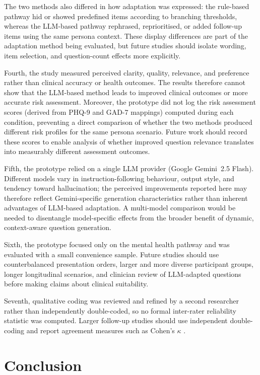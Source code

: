 \documentclass[conference]{IEEEtran}
\begin{document}
The two methods also differed in how adaptation was expressed: the rule-based
pathway hid or showed predefined items according to branching thresholds,
whereas the LLM-based pathway rephrased, reprioritised, or added follow-up
items using the same persona context. These display differences are part of
the adaptation method being evaluated, but future studies should isolate
wording, item selection, and question-count effects more explicitly.

Fourth, the study measured perceived clarity, quality, relevance, and
preference rather than clinical accuracy or health outcomes. The results
therefore cannot show that the LLM-based method leads to improved clinical
outcomes or more accurate risk assessment. Moreover, the prototype did not log
the risk assessment scores (derived from PHQ-9 and GAD-7 mappings) computed
during each condition, preventing a direct comparison of whether the two
methods produced different risk profiles for the same persona scenario. Future
work should record these scores to enable analysis of whether improved question
relevance translates into measurably different assessment outcomes.

Fifth, the prototype relied on a single LLM provider (Google Gemini~2.5
Flash). Different models vary in instruction-following behaviour, output
style, and tendency toward hallucination; the perceived improvements
reported here may therefore reflect Gemini-specific generation
characteristics rather than inherent advantages of LLM-based adaptation.
A multi-model comparison would be needed to disentangle model-specific
effects from the broader benefit of dynamic, context-aware question
generation.

Sixth, the prototype focused only on the mental health pathway and was
evaluated with a small convenience sample. Future studies should use
counterbalanced presentation orders, larger and more diverse participant
groups, longer longitudinal scenarios, and clinician review of
LLM-adapted questions before making claims about clinical suitability.

Seventh, qualitative coding was reviewed and refined by a second researcher
rather than independently double-coded, so no formal inter-rater reliability
statistic was computed. Larger follow-up studies should use independent
double-coding and report agreement measures such as Cohen's $\kappa$
\cite{cohen1960}.

\section{Conclusion}
\label{sec:conclusion}
\end{document}
